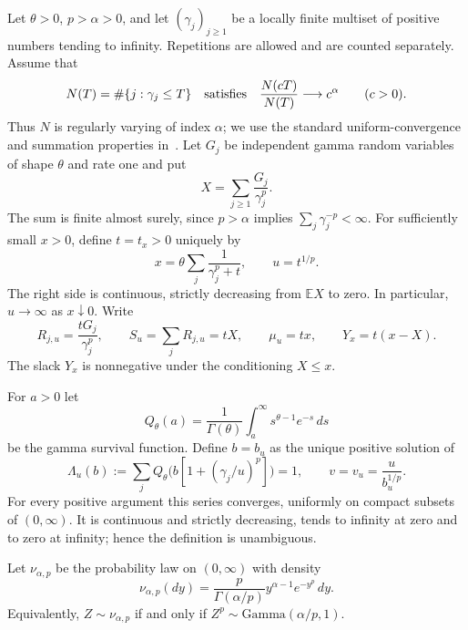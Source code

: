 \documentclass[11pt]{article}
\theoremstyle{definition}
\theoremstyle{remark}
\begin{document}
Let $\theta>0$, $p>\alpha>0$, and let $(\gamma_j)_{j\ge1}$ be a locally
finite multiset of positive numbers tending to infinity.  Repetitions are
allowed and are counted separately.  Assume that
\[
 N(T)=\#\{j:\gamma_j\le T\}\quad\hbox{satisfies}\quad
 \frac{N(cT)}{N(T)}\longrightarrow c^\alpha\qquad(c>0).
\]
Thus $N$ is regularly varying of index $\alpha$; we use the standard uniform-convergence and summation properties in~\cite{BGT1987}.  Let $G_j$ be independent
gamma random variables of shape $\theta$ and rate one and put
\[
 X=\sum_{j\ge1}\frac{G_j}{\gamma_j^p}.
\]
The sum is finite almost surely, since $p>\alpha$ implies
$\sum_j\gamma_j^{-p}<\infty$.
For sufficiently small $x>0$, define $t=t_x>0$ uniquely by
\begin{equation}\label{ext:eq:saddle}
 x=\theta\sum_j\frac1{\gamma_j^p+t},\qquad u=t^{1/p}.
\end{equation}
The right side is continuous, strictly decreasing from $\mathbb E X$ to
zero.  In particular, $u\to\infty$ as $x\downarrow0$.
Write
\[
 R_{j,u}=\frac{tG_j}{\gamma_j^p},\qquad
 S_u=\sum_jR_{j,u}=tX,\qquad \mu_u=tx,
 \qquad Y_x=t(x-X).
\]
The slack $Y_x$ is nonnegative under the conditioning $X\le x$.

For $a>0$ let
\[
 Q_\theta(a)=\frac1{\Gamma(\theta)}
       \int_a^\infty s^{\theta-1}e^{-s}\,ds
\]
be the gamma survival function.  Define $b=b_u$ as the unique positive
solution of
\begin{equation}\label{ext:eq:exactb}
 \Lambda_u(b):=
 \sum_j Q_\theta\bigl(b[1+(\gamma_j/u)^p]\bigr)=1,
 \qquad v=v_u=\frac{u}{b_u^{1/p}}.
\end{equation}
For every positive argument this series converges, uniformly on compact
subsets of $(0,\infty)$.  It is continuous and strictly decreasing, tends
to infinity at zero and to zero at infinity; hence the definition is
unambiguous.

Let $\nu_{\alpha,p}$ be the probability law on $(0,\infty)$ with density
\begin{equation}\label{ext:eq:mark}
 \nu_{\alpha,p}(dy)=
 \frac{p}{\Gamma(\alpha/p)}y^{\alpha-1}e^{-y^p}\,dy.
\end{equation}
Equivalently, $Z\sim\nu_{\alpha,p}$ if and only if
$Z^p\sim\mathrm{Gamma}(\alpha/p,1)$.
\end{document}

